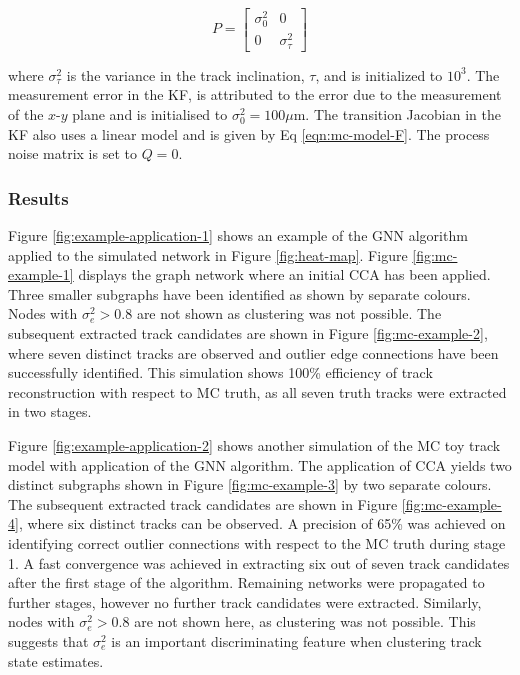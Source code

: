 \begin{equation}
P = \begin{bmatrix} \sigma_0^{2} & 0 \\ 0 & \sigma_{\tau}^2 \end{bmatrix}
\label{eqn:mc-model-P-init-covariance}
\end{equation}

where $\sigma_{\tau}^2$ is the variance in the track inclination, $\tau$, and is initialized to $10^3$. The measurement error in the KF, is attributed to the error due to the measurement of the $x$-$y$ plane and is initialised to $\sigma_{0}^{2} = 100\mu$m. The transition Jacobian in the KF also uses a linear model and is given by Eq \eqref{eqn:mc-model-F}. The process noise matrix is set to $Q = 0$.



\subsubsection{Results}

Figure \ref{fig:example-application-1} shows an example of the GNN algorithm applied to the simulated network in Figure \ref{fig:heat-map}. Figure \ref{fig:mc-example-1} displays the graph network where an initial CCA has been applied. Three smaller subgraphs have been identified as shown by separate colours. Nodes with $\sigma_e^2 > 0.8$ are not shown as clustering was not possible. The subsequent extracted track candidates are shown in Figure \ref{fig:mc-example-2}, where seven distinct tracks are observed and outlier edge connections have been successfully identified. This simulation shows 100\% efficiency of track reconstruction with respect to MC truth, as all seven truth tracks were extracted in two stages. 

Figure \ref{fig:example-application-2} shows another simulation of the MC toy track model with application of the GNN algorithm. The application of CCA yields two distinct subgraphs shown in Figure \ref{fig:mc-example-3} by two separate colours. The subsequent extracted track candidates are shown in Figure \ref{fig:mc-example-4}, where six distinct tracks can be observed. A precision of 65\% was achieved on identifying correct outlier connections with respect to the MC truth during stage 1. A fast convergence was achieved in extracting six out of seven track candidates after the first stage of the algorithm. Remaining networks were propagated to further stages, however no further track candidates were extracted. Similarly, nodes with $\sigma_e^2 > 0.8$ are not shown here, as clustering was not possible. This suggests that $\sigma_{e}^{2}$ is an important discriminating feature when clustering track state estimates. 

